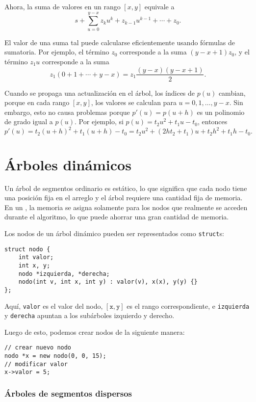 Ahora, la suma de valores en un rango $[x,y]$ equivale a
\[s+\sum_{u=0}^{y-x} z_k u^k + z_{k-1} u^{k-1} + \cdots + z_0.\]

El valor de una suma tal puede calcularse eficientemente usando fórmulas de
sumatoria. Por ejemplo, el término $z_0$ corresponde a la suma $(y-x+1)z_0$,
y el término $z_1 u$ corresponde a la suma
\[z_1(0+1+\cdots+y-x) = z_1 \frac{(y-x)(y-x+1)}{2} .\]

Cuando se propaga una actualización en el árbol, los índices de $p(u)$
cambian, porque en cada rango $[x,y]$, los valores se calculan para
$u=0,1,\ldots,y-x$. Sin embargo, esto no causa problemas porque
$p'(u)=p(u+h)$ es un polinomio de grado igual a $p(u)$. Por ejemplo, si
$p(u)=t_2 u^2+t_1 u-t_0$, entonces
\[p'(u)=t_2(u+h)^2+t_1(u+h)-t_0=t_2 u^2 + (2ht_2+t_1)u+t_2h^2+t_1h-t_0.\]

\section{Árboles dinámicos}


Un árbol de segmentos ordinario es estático, lo que significa que cada nodo
tiene una posición fija en el arreglo y el árbol requiere una cantidad fija
de memoria. En un , la memoria se asigna
solamente para los nodos que realmente se acceden durante el algoritmo, lo
que puede ahorrar una gran cantidad de memoria.

Los nodos de un árbol dinámico pueden ser representados como \texttt{struct}s:
\begin{lstlisting}
struct nodo {
    int valor;
    int x, y;
    nodo *izquierda, *derecha;
    nodo(int v, int x, int y) : valor(v), x(x), y(y) {}
};
\end{lstlisting}
Aquí, \texttt{valor} es el valor del nodo, $[\texttt{x},\texttt{y}]$ es el
rango correspondiente, e \texttt{izquierda} y \texttt{derecha} apuntan a los
subárboles izquierdo y derecho.

Luego de esto, podemos crear nodos de la siguiente manera:
\begin{lstlisting}
// crear nuevo nodo
nodo *x = new nodo(0, 0, 15);
// modificar valor
x->valor = 5;
\end{lstlisting}

\subsubsection{Árboles de segmentos dispersos}

